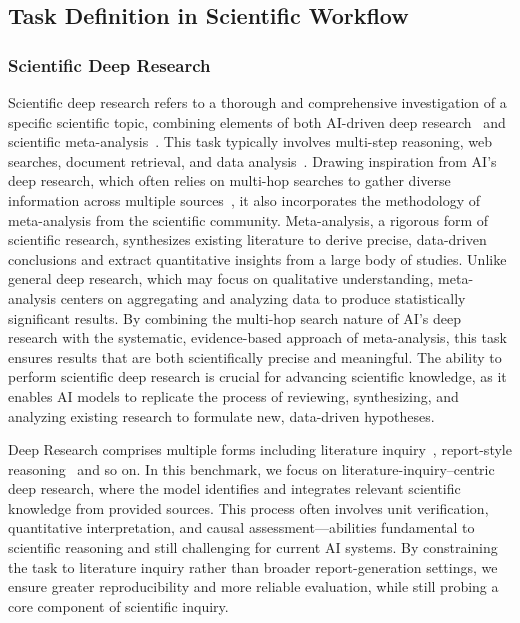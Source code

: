 \subsection{Task Definition in Scientific Workflow}

\subsubsection{Scientific Deep Research}
Scientific deep research refers to a thorough and comprehensive investigation of a specific scientific topic, combining elements of both AI-driven deep research~\cite{xu2025comprehensive, hu2025flowsearch, shi2025dualresearch} and scientific meta-analysis~\cite{field2010meta, xu2025manalyzer}. This task typically involves multi-step reasoning, web searches, document retrieval, and data analysis~\cite{ac1f09077393404a8bea5141d8710259,trivedi-etal-2023-interleaving,asai2024selfrag}. Drawing inspiration from AI's deep research, which often relies on multi-hop searches to gather diverse information across multiple sources~\cite{shao-etal-2024-assisting}, it also incorporates the methodology of meta-analysis from the scientific community. Meta-analysis, a rigorous form of scientific research, synthesizes existing literature to derive precise, data-driven conclusions and extract quantitative insights from a large body of studies. Unlike general deep research, which may focus on qualitative understanding, meta-analysis centers on aggregating and analyzing data to produce statistically significant results. By combining the multi-hop search nature of AI's deep research with the systematic, evidence-based approach of meta-analysis, this task ensures results that are both scientifically precise and meaningful. The ability to perform scientific deep research is crucial for advancing scientific knowledge, as it enables AI models to replicate the process of reviewing, synthesizing, and analyzing existing research to formulate new, data-driven hypotheses.~\cite{Wang2023,lu2024aiscientistfullyautomated}

Deep Research comprises multiple forms including literature inquiry~\cite{Bosse2025DeepRB}, report-style reasoning~\cite{du2025deepresearchbenchcomprehensivebenchmark} and so on. In this benchmark, we focus on literature-inquiry–centric deep research, where the model identifies and integrates relevant scientific knowledge from provided sources. This process often involves unit verification, quantitative interpretation, and causal assessment—abilities fundamental to scientific reasoning and still challenging for current AI systems. By constraining the task to literature inquiry rather than broader report-generation settings, we ensure greater reproducibility and more reliable evaluation, while still probing a core component of scientific inquiry.

